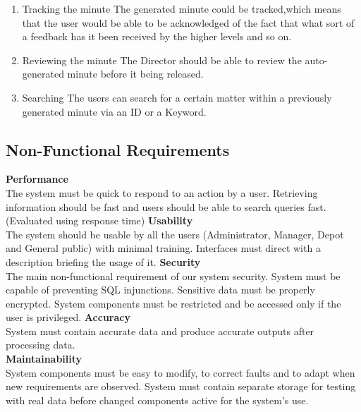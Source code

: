 \documentclass[a4paper,beamer]{article}
\begin{document}
\begin{enumerate}
		\item Tracking the minute \newline
		The generated minute could be tracked,which means that the user would be able to be acknowledged of the fact that what sort of a feedback has it been received by the higher levels and so on.
		
		\item Reviewing the minute \newline
		The Director should be able to review the auto-generated minute before it being released.
		
		\item Searching \newline
		The users can search for a certain matter within a previously generated minute via an ID or a Keyword.
		
	\end{enumerate}
	
	\newpage 
	
	\subsection{Non-Functional Requirements}
	\textbf{Performance}\\
	The system must be quick to respond to an action by a user. Retrieving information should be fast and users should be able to search queries fast. (Evaluated using response time) \newline
	\newline
	\textbf{Usability}\\
	The system should be usable by all the users (Administrator, Manager, Depot and General public) with minimal training. Interfaces must direct with a description briefing the usage of it.\newline
	\newline
	\textbf{Security}\\
	The main non-functional requirement of our system security. System must be capable of preventing SQL injunctions. Sensitive data must be properly encrypted. System components must be restricted and be accessed only if the user is privileged.\newline
	\newline
	\textbf{Accuracy}\\
	System must contain accurate data and produce accurate outputs after processing data.\\
	\newline
	\textbf{Maintainability}\\
	System components must be easy to modify, to correct faults and to adapt when new requirements are observed. System must contain separate storage for testing with real data before changed components active for the system’s use.\newline
	
\end{document}
